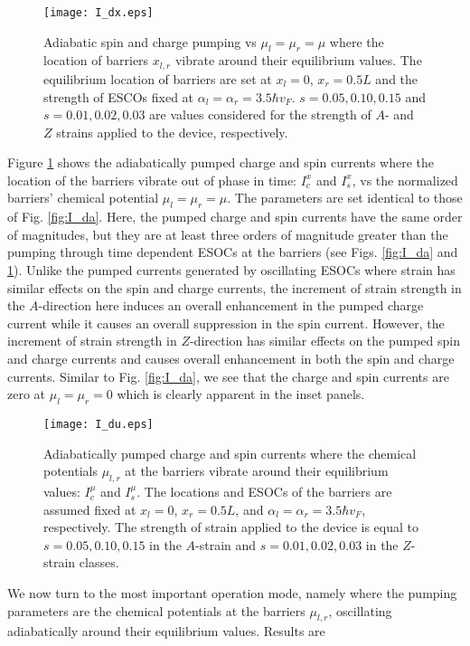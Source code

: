 \documentclass[doublecol]{epl2}
\begin{document}
\begin{figure}
\centerline{\texttt{[image: I\_dx.eps]}}
\caption{\label{fig:I_dx} Adiabatic spin and charge pumping vs
$\mu_l=\mu_r=\mu$ where the location of barriers $x_{l,r}$ vibrate
around their equilibrium values. The equilibrium location of
barriers are set at $x_l=0$, $x_r=0.5L$ and the strength of ESCOs
fixed at $\alpha_l=\alpha_r=3.5\hbar v_F$. $s=0.05, 0.10, 0.15$ and
$s=0.01, 0.02, 0.03$ are values considered for the strength of $A$-
and $Z$ strains applied to the device, respectively.}
\end{figure}
%
Figure \ref{fig:I_dx} shows the adiabatically pumped charge and spin
currents where the location of the barriers vibrate out of phase in
time: $I^{x}_c$ and $I^{x}_s$, vs the normalized barriers' chemical
potential $\mu_{l}=\mu_{r}=\mu$.
The parameters are set identical to those of Fig. \ref{fig:I_da}.
Here, the pumped charge and spin currents have the same order of
magnitudes, but they are at least three orders of magnitude greater
than the pumping through time dependent ESOCs at the barriers (see
Figs. \ref{fig:I_da} and \ref{fig:I_dx}). Unlike the pumped currents
generated by oscillating ESOCs where strain has similar effects on
the spin and charge currents, the increment of strain strength in
the $A$-direction here induces an overall enhancement in the pumped
charge current while it causes an overall suppression in the spin
current. However, the increment of strain strength in $Z$-direction
has similar effects on the pumped spin and charge currents and
causes overall enhancement in both the spin and charge currents.
Similar to Fig. \ref{fig:I_da}, we see that the charge and spin
currents are zero at $\mu_l=\mu_r=0$ which is clearly apparent in
the inset panels.
\begin{figure}
\centerline{\texttt{[image: I\_du.eps]}}
\caption{\label{fig:I_du} Adiabatically pumped charge and spin
currents where the chemical potentials $\mu_{l,r}$ at the barriers
vibrate around their equilibrium values: $I^{\mu}_c$ and
$I^{\mu}_s$. The locations and ESOCs of the barriers are assumed
fixed at $x_l=0$, $x_r=0.5L$, and $\alpha_l=\alpha_r=3.5\hbar v_F$,
respectively. The strength of strain applied to the device is equal to
$s=0.05, 0.10, 0.15$ in the $A$-strain and $s=0.01, 0.02, 0.03$ in
the $Z$-strain classes.}
\end{figure}
We now turn to the most important operation mode, namely where the pumping parameters are the chemical
potentials at the barriers $\mu_{l,r}$, oscillating adiabatically around their equilibrium values. Results are
\end{document}
